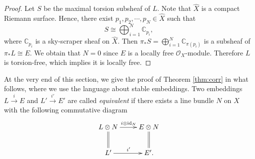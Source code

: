 \documentclass[12pt]{article}
\begin{document}
\begin{proof}
Let $S$ be the maximal torsion subsheaf of $L$. Note that $\widehat{X}$ is a compact Riemann surface. Hence, there exist $p_{1}, p_{2}, \cdots, p_{N} \in \widehat{X}$ such that
\[ S \cong \bigoplus_{i=1}^{N} \mathbb{C}_{p_{i}},  \]
where $\mathbb{C}_{p_{i}}$ is a sky-scraper sheaf on $\widehat{X}$. Then $\pi_{*}S = \bigoplus_{i=1}^{N}\mathbb{C}_{\pi(p_{i})}$ is a subsheaf of $\pi_{*}L \cong E$. We obtain that $N = 0$ since $E$ is a locally free $\mathcal{O}_{X}$-module. Therefore $L$ is torsion-free, which implies it is locally free.
\end{proof}

At the very end of this section, we give the proof of Theorem \ref{thm:corr} in what follows, where we use the language about stable embeddings.  Two embeddings $L \xrightarrow{i} E$ and $L' \xrightarrow{i'} E'$ are called {\it equivalent} if there exists a line bundle $N$ on $X$ with the following commutative diagram
\[ \xymatrix{
L \otimes N \ar@{=}[d] \ar[r]^{i \otimes \operatorname{id}_{N}} & E \otimes N \ar@{=}[d] \\
L'                \ar[r]^{i'}                   & E'.
} \]
\end{document}
